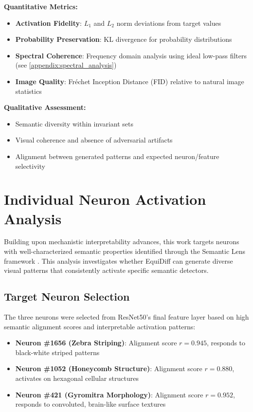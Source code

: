 \documentclass[licencjacka,en]{pracamgr}
\newcommand{\method}[1]{EquiDiff}  %
\begin{document}
\textbf{Quantitative Metrics:}
\begin{itemize}
\item \textbf{Activation Fidelity}: $L_1$ and $L_2$ norm deviations from target values
\item \textbf{Probability Preservation}: KL divergence for probability distributions
\item \textbf{Spectral Coherence}: Frequency domain analysis using ideal low-pass filters (see \cref{appendix:spectral_analysis})
\item \textbf{Image Quality}: Fréchet Inception Distance (FID) relative to natural image statistics
\end{itemize}

\textbf{Qualitative Assessment:}
\begin{itemize}
\item Semantic diversity within invariant sets
\item Visual coherence and absence of adversarial artifacts
\item Alignment between generated patterns and expected neuron/feature selectivity
\end{itemize}

\section{Individual Neuron Activation Analysis}

Building upon mechanistic interpretability advances, this work targets neurons with well-characterized semantic properties identified through the Semantic Lens framework \citep{dreyer2025mechanisticunderstandingvalidationlarge}. This analysis investigates whether \method{} can generate diverse visual patterns that consistently activate specific semantic detectors.

\subsection{Target Neuron Selection}

The three neurons were selected from ResNet50's final feature layer based on high semantic alignment scores and interpretable activation patterns:

\begin{itemize}
\item \textbf{Neuron \#1656 (Zebra Striping)}: Alignment score $r = 0.945$, responds to black-white striped patterns
\item \textbf{Neuron \#1052 (Honeycomb Structure)}: Alignment score $r = 0.880$, activates on hexagonal cellular structures  
\item \textbf{Neuron \#421 (Gyromitra Morphology)}: Alignment score $r = 0.952$, responds to convoluted, brain-like surface textures
\end{itemize}
\end{document}
